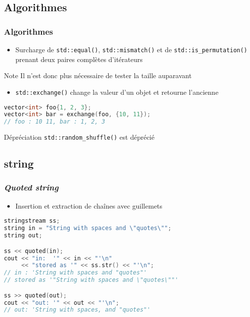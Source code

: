 \documentclass[C++.tex]{subfiles}
\begin{document}
\subsection*{Algorithmes}
\begin{frame}[fragile]
	\frametitle{Algorithmes}
	\begin{itemize}
		\item Surcharge de \lstinline|std::equal()|, \lstinline|std::mismatch()| et de \lstinline|std::is_permutation()| prenant deux paires complètes d'itérateurs
	\end{itemize}

	\begin{block}{Note}
		Il n'est donc plus nécessaire de tester la taille auparavant
	\end{block}

	\begin{itemize}
		\item \lstinline|std::exchange()| change la valeur d'un objet et retourne l'ancienne

	\end{itemize}

	\begin{lstlisting}[language=C++]
vector<int> foo{1, 2, 3};
vector<int> bar = exchange(foo, {10, 11});
// foo : 10 11, bar : 1, 2, 3\end{lstlisting}

	\begin{block}{Dépréciation}
		\lstinline|std::random_shuffle()| est déprécié

	\end{block}
\end{frame}

\subsection*{string}
\begin{frame}[fragile]
	\frametitle{\textit{Quoted string}}
	\begin{itemize}
		\item Insertion et extraction de chaînes avec guillemets
	\end{itemize}

	\begin{lstlisting}[language=C++]
stringstream ss;
string in = "String with spaces and \"quotes\"";
string out;

ss << quoted(in);
cout << "in:  '" << in << "'\n"
     << "stored as '" << ss.str() << "'\n";
// in : 'String with spaces and "quotes"'
// stored as '"String with spaces and \"quotes\""'

ss >> quoted(out);
cout << "out: '" << out << "'\n";
// out: 'String with spaces, and "quotes"'\end{lstlisting}

\end{frame}
\end{document}
